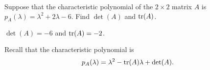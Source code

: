 \documentclass{ximera}
\author{Marty Golubitsky}
\begin{document}

\begin{exercise}\label{c6.4.2ba}

Suppose that the characteristic polynomial of the $2\times 2$ matrix $A$ is $p_A(\lambda) = \lambda^2 + 2\lambda - 6$.  Find $\det(A)$ and ${\rm tr}(A)$.
  
\begin{solution}

\ans $\det(A) = -6$ and ${\rm tr}(A) = -2$.

\soln Recall that the characteristic polynomial is 
\[
p_A(\lambda) = \lambda^2 - {\rm tr}(A)\lambda + \det(A).
\]

\end{solution}
\end{exercise}
\end{document}
